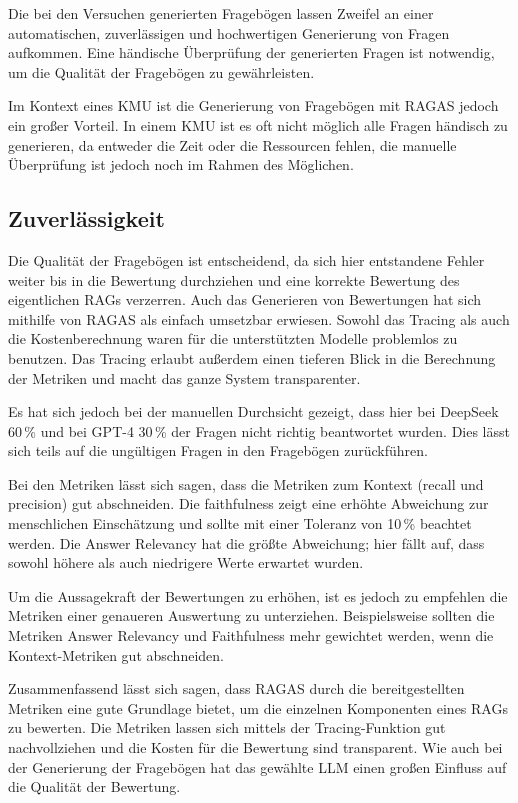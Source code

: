 Die bei den Versuchen generierten Fragebögen lassen Zweifel an einer automatischen, zuverlässigen und hochwertigen Generierung von Fragen aufkommen.
Eine händische Überprüfung der generierten Fragen ist notwendig, um die Qualität der Fragebögen zu gewährleisten.

Im Kontext eines KMU ist die Generierung von Fragebögen mit RAGAS jedoch ein großer Vorteil.
In einem KMU ist es oft nicht möglich alle Fragen händisch zu generieren, da entweder die Zeit oder die Ressourcen fehlen, die manuelle Überprüfung ist jedoch noch im Rahmen des Möglichen.

\subsection{Zuverlässigkeit}

Die Qualität der Fragebögen ist entscheidend, da sich hier entstandene Fehler weiter bis in die Bewertung durchziehen und eine korrekte Bewertung des eigentlichen RAGs verzerren.
Auch das Generieren von Bewertungen hat sich mithilfe von RAGAS als einfach umsetzbar erwiesen.
Sowohl das Tracing als auch die Kostenberechnung waren für die unterstützten Modelle problemlos zu benutzen.
Das Tracing erlaubt außerdem einen tieferen Blick in die Berechnung der Metriken und macht das ganze System transparenter.

Es hat sich jedoch bei der manuellen Durchsicht gezeigt, dass hier bei DeepSeek 60\,\% und bei GPT-4 30\,\% der Fragen nicht richtig beantwortet wurden.
Dies lässt sich teils auf die ungültigen Fragen in den Fragebögen zurückführen.

Bei den Metriken lässt sich sagen, dass die Metriken zum Kontext (recall und precision) gut abschneiden.
Die faithfulness zeigt eine erhöhte Abweichung zur menschlichen Einschätzung und sollte mit einer Toleranz von 10\,\% beachtet werden.
Die Answer Relevancy hat die größte Abweichung; hier fällt auf, dass sowohl höhere als auch niedrigere Werte erwartet wurden.

Um die Aussagekraft der Bewertungen zu erhöhen, ist es jedoch zu empfehlen die Metriken einer genaueren Auswertung zu unterziehen.
Beispielsweise sollten die Metriken Answer Relevancy und Faithfulness mehr gewichtet werden, wenn die Kontext-Metriken gut abschneiden.

Zusammenfassend lässt sich sagen, dass RAGAS durch die bereitgestellten Metriken eine gute Grundlage bietet, um die einzelnen Komponenten eines RAGs zu bewerten.
Die Metriken lassen sich mittels der Tracing-Funktion gut nachvollziehen und die Kosten für die Bewertung sind transparent.
Wie auch bei der Generierung der Fragebögen hat das gewählte LLM einen großen Einfluss auf die Qualität der Bewertung.

